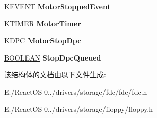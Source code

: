 \begin{DoxyCompactItemize}
\hyperlink{struct___k_e_v_e_n_t}{K\+E\+V\+E\+NT} {\bfseries Motor\+Stopped\+Event}
\item 
\mbox{\label{struct___c_o_n_t_r_o_l_l_e_r___i_n_f_o_a60edc11cf0820c57a418f725392601d4}} 
\hyperlink{struct___k_t_i_m_e_r}{K\+T\+I\+M\+ER} {\bfseries Motor\+Timer}
\item 
\mbox{\label{struct___c_o_n_t_r_o_l_l_e_r___i_n_f_o_ac304b6dcbe36f73a1dbc18446f76ea4b}} 
\hyperlink{struct___k_d_p_c}{K\+D\+PC} {\bfseries Motor\+Stop\+Dpc}
\item 
\mbox{\label{struct___c_o_n_t_r_o_l_l_e_r___i_n_f_o_a1f880e150827ed87cb8cd50baa69b0ea}} 
\hyperlink{_processor_bind_8h_a112e3146cb38b6ee95e64d85842e380a}{B\+O\+O\+L\+E\+AN} {\bfseries Stop\+Dpc\+Queued}
\end{DoxyCompactItemize}


该结构体的文档由以下文件生成\+:\begin{DoxyCompactItemize}
\item 
E\+:/\+React\+O\+S-\/0../drivers/storage/fdc/fdc/fdc.\+h\item 
E\+:/\+React\+O\+S-\/0../drivers/storage/floppy/floppy.\+h\end{DoxyCompactItemize}
